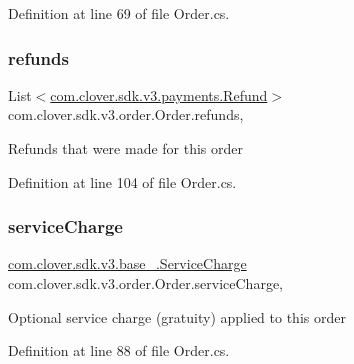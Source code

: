 Definition at line 69 of file Order.\+cs.

\mbox{\label{classcom_1_1clover_1_1sdk_1_1v3_1_1order_1_1_order_a6741711b01ec81bc71bbb2e46f943268}} 
\subsubsection{\texorpdfstring{refunds}{refunds}}
{\footnotesize\ttfamily List$<$\hyperlink{classcom_1_1clover_1_1sdk_1_1v3_1_1payments_1_1_refund}{com.\+clover.\+sdk.\+v3.\+payments.\+Refund}$>$ com.\+clover.\+sdk.\+v3.\+order.\+Order.\+refunds\hspace{0.3cm}{\ttfamily [get]}, {\ttfamily [set]}}



Refunds that were made for this order 



Definition at line 104 of file Order.\+cs.

\mbox{\label{classcom_1_1clover_1_1sdk_1_1v3_1_1order_1_1_order_ae659444ff65f03ada46a9b85dad4025b}} 
\subsubsection{\texorpdfstring{service\+Charge}{serviceCharge}}
{\footnotesize\ttfamily \hyperlink{classcom_1_1clover_1_1sdk_1_1v3_1_1base___1_1_service_charge}{com.\+clover.\+sdk.\+v3.\+base\+\_\+.\+Service\+Charge} com.\+clover.\+sdk.\+v3.\+order.\+Order.\+service\+Charge\hspace{0.3cm}{\ttfamily [get]}, {\ttfamily [set]}}



Optional service charge (gratuity) applied to this order 



Definition at line 88 of file Order.\+cs.

